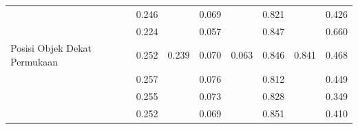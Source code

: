 \begin{table}[]
\begin{tabular}{|l|cc|cc|cc|c|}
                                                      & \multicolumn{1}{c|}{\cellcolor[HTML]{FFFFFF}0.246} & \cellcolor[HTML]{FFFFFF}                         & \multicolumn{1}{c|}{\cellcolor[HTML]{FFFFFF}0.069} & \cellcolor[HTML]{FFFFFF}                           & \multicolumn{1}{c|}{\cellcolor[HTML]{FFFFFF}0.821} & \cellcolor[HTML]{FFFFFF}                        & \multicolumn{1}{c|}{\cellcolor[HTML]{FFFFFF}0.426}   \\ \cline{2-2} \cline{4-4} \cline{6-6}
                                                      & \multicolumn{1}{c|}{\cellcolor[HTML]{FFFFFF}0.224} & \cellcolor[HTML]{FFFFFF}                         & \multicolumn{1}{c|}{\cellcolor[HTML]{FFFFFF}0.057} & \cellcolor[HTML]{FFFFFF}                           & \multicolumn{1}{c|}{\cellcolor[HTML]{FFFFFF}0.847} & \cellcolor[HTML]{FFFFFF}                        & \multicolumn{1}{c|}{\cellcolor[HTML]{FFFFFF}0.660}   \\ \cline{2-2} \cline{4-4} \cline{6-6}
  \multirow{-5}{*}{Posisi Objek Dekat Permukaan} & \multicolumn{1}{c|}{\cellcolor[HTML]{FFFFFF}0.252} & \multirow{-5}{*}{\cellcolor[HTML]{FFFFFF}0.239}  & \multicolumn{1}{c|}{\cellcolor[HTML]{FFFFFF}0.070} & \multirow{-5}{*}{\cellcolor[HTML]{FFFFFF}0.063}    & \multicolumn{1}{c|}{\cellcolor[HTML]{FFFFFF}0.846} & \multirow{-5}{*}{\cellcolor[HTML]{FFFFFF}0.841} & \multicolumn{1}{c|}{\cellcolor[HTML]{FFFFFF}0.468}   \\ \hline
                                                      & \multicolumn{1}{c|}{\cellcolor[HTML]{FFFFFF}0.257} & \cellcolor[HTML]{FFFFFF}                         & \multicolumn{1}{c|}{\cellcolor[HTML]{FFFFFF}0.076} & \cellcolor[HTML]{FFFFFF}                           & \multicolumn{1}{c|}{\cellcolor[HTML]{FFFFFF}0.812} & \cellcolor[HTML]{FFFFFF}                        & \multicolumn{1}{c|}{\cellcolor[HTML]{FFFFFF}0.449}   \\ \cline{2-2} \cline{4-4} \cline{6-6}
                                                      & \multicolumn{1}{c|}{\cellcolor[HTML]{FFFFFF}0.255} & \cellcolor[HTML]{FFFFFF}                         & \multicolumn{1}{c|}{\cellcolor[HTML]{FFFFFF}0.073} & \cellcolor[HTML]{FFFFFF}                           & \multicolumn{1}{c|}{\cellcolor[HTML]{FFFFFF}0.828} & \cellcolor[HTML]{FFFFFF}                        & \multicolumn{1}{c|}{\cellcolor[HTML]{FFFFFF}0.349}   \\ \cline{2-2} \cline{4-4} \cline{6-6}
                                                      & \multicolumn{1}{c|}{\cellcolor[HTML]{FFFFFF}0.252} & \cellcolor[HTML]{FFFFFF}                         & \multicolumn{1}{c|}{\cellcolor[HTML]{FFFFFF}0.069} & \cellcolor[HTML]{FFFFFF}                           & \multicolumn{1}{c|}{\cellcolor[HTML]{FFFFFF}0.851} & \cellcolor[HTML]{FFFFFF}                        & \multicolumn{1}{c|}{\cellcolor[HTML]{FFFFFF}0.410}   \\ \cline{2-2} \cline{4-4} \cline{6-6}

\end{tabular}
\end{table}
